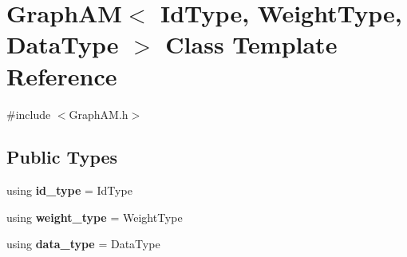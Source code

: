 \hypertarget{class_graph_a_m}{}\section{Graph\+AM$<$ Id\+Type, Weight\+Type, Data\+Type $>$ Class Template Reference}
\label{class_graph_a_m}


{\ttfamily \#include $<$Graph\+A\+M.\+h$>$}

\subsection*{Public Types}
\begin{DoxyCompactItemize}
\item 
\mbox{\label{class_graph_a_m_ae865560a40d3675b3816fd4b228eaa9a}} 
using {\bfseries id\+\_\+type} = Id\+Type
\item 
\mbox{\label{class_graph_a_m_a543fce2bc8d47cc3a4e2d4ae117199b8}} 
using {\bfseries weight\+\_\+type} = Weight\+Type
\item 
\mbox{\label{class_graph_a_m_acc608a9a10fb4d899dc0a5433b92f6c0}} 
using {\bfseries data\+\_\+type} = Data\+Type
\end{DoxyCompactItemize}
